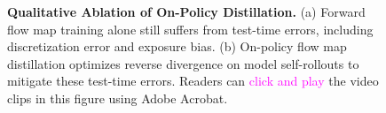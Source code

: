 \begin{figure}[!tb]
  \centering
   \caption{\textbf{Qualitative Ablation of On-Policy Distillation.} (a) Forward flow map training alone still suffers from test-time errors, including discretization error and exposure bias. (b) On-policy flow map distillation optimizes reverse divergence on model self-rollouts to mitigate these test-time errors. Readers can \textcolor{magenta}{click and play} the video clips in this figure using Adobe Acrobat.}
  \label{fig:ablation_onpolicy}
\end{figure}
